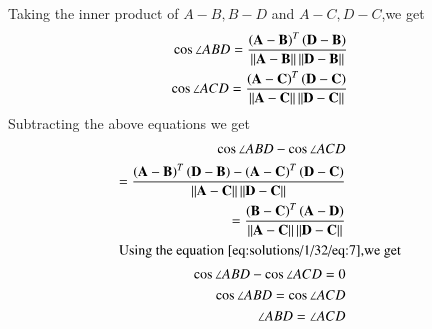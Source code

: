 Taking the inner product of $A-B,B-D$ and $A-C,D-C$,we get
\begin{align}
    \cos\angle ABD=\frac{\left(\mathbf{A}-\mathbf{B}\right)^T\left(\mathbf{D}-\mathbf{B}\right)}{\left\lVert\mathbf{A}-\mathbf{B}\right\rVert\left\lVert\mathbf{D}-\mathbf{B}\right\rVert}\\
    \cos\angle ACD=\frac{\left(\mathbf{A}-\mathbf{C}\right)^T\left(\mathbf{D}-\mathbf{C}\right)}{\left\lVert\mathbf{A}-\mathbf{C}\right\rVert\left\lVert\mathbf{D}-\mathbf{C}\right\rVert}
\end{align}
Subtracting the above equations we get 
\begin{align}
    \cos\angle ABD-\cos\angle ACD\\
    =\frac{\left(\mathbf{A}-\mathbf{B}\right)^T\left(\mathbf{D}-\mathbf{B}\right)-\left(\mathbf{A}-\mathbf{C}\right)^T\left(\mathbf{D}-\mathbf{C}\right)}{\left\lVert\mathbf{A}-\mathbf{C}\right\rVert\left\lVert\mathbf{D}-\mathbf{C}\right\rVert}\\
    =\frac{\left(\mathbf{B}-\mathbf{C}\right)^T\left(\mathbf{A}-\mathbf{D}\right)}{\left\lVert\mathbf{A}-\mathbf{C}\right\rVert\left\lVert\mathbf{D}-\mathbf{C}\right\rVert}\\
    \intertext{Using the equation \eqref{eq:solutions/1/32/eq:7},we get}
    \cos\angle ABD-\cos\angle ACD=0\\
    \cos\angle ABD=\cos\angle ACD\\
    \angle ABD=\angle ACD
\end{align}
